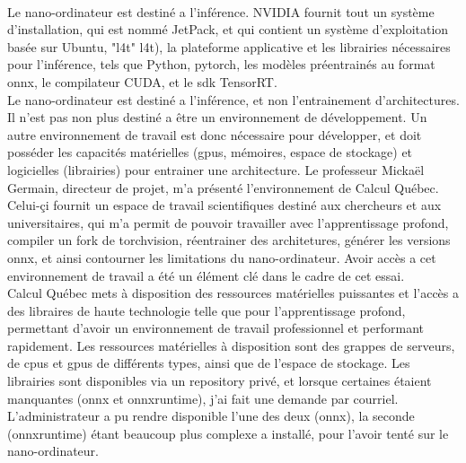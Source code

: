 ﻿
\vspace{\baselineskip}
\\
\noindent Le nano-ordinateur est destiné a l'inférence. NVIDIA fournit tout un système d'installation, qui est nommé JetPack, et qui contient un système d'exploitation basée sur Ubuntu, "\acrlong{l4t}" \acrshort{l4t}), la plateforme applicative et les librairies nécessaires pour l'inférence, tels que Python, pytorch, les modèles préentrainés au format \acrshort{onnx}, le compilateur CUDA, et le \acrshort{sdk} TensorRT.
\vspace{\baselineskip}
\\
\noindent Le nano-ordinateur est destiné a l'inférence, et non l'entrainement d'architectures. Il n'est pas non plus destiné a être un environnement de développement. Un autre environnement de travail est donc nécessaire pour développer, et doit posséder les capacités matérielles (\acrshort{gpu}s, mémoires, espace de stockage) et logicielles (librairies) pour entrainer une architecture. Le professeur Mickaël Germain, directeur de projet, m'a présenté l'environnement de Calcul Québec. Celui-çi fournit un espace de travail scientifiques destiné aux chercheurs et aux universitaires, qui m'a permit  de pouvoir travailler avec l'apprentissage profond, compiler un fork de torchvision, réentrainer des architetures, générer les versions \acrshort{onnx}, et ainsi contourner les limitations du nano-ordinateur. Avoir accès a cet environnement de travail a été un élément clé dans le cadre de cet essai.
\vspace{\baselineskip}
\\
\noindent Calcul Québec mets à disposition des ressources matérielles puissantes et l'accès a des libraires de haute technologie telle que pour l'apprentissage profond, permettant d'avoir un environnement de travail professionnel et performant rapidement. Les ressources matérielles à disposition sont des grappes de serveurs, de \acrshort{cpu}s et \acrshort{gpu}s de différents types, ainsi que de l'espace de stockage. Les librairies sont disponibles via un repository privé, et lorsque certaines étaient manquantes (\acrshort{onnx} et onnxruntime), j'ai fait une demande par courriel. L'administrateur a pu rendre disponible l'une des deux (\acrshort{onnx}), la seconde (onnxruntime) étant beaucoup plus complexe a installé, pour l'avoir tenté sur le nano-ordinateur. 
\vspace{\baselineskip}
\\
